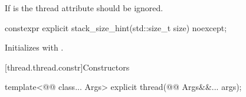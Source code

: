 \documentclass{wg21}
\begin{document}
\begin{addedblock}
If  is  the thread attribute should be ignored.

\begin{itemdecl}
constexpr explicit stack_size_hint(std::size_t size) noexcept;
\end{itemdecl}

\begin{itemdescr}
\effects Initializes  with .
\end{itemdescr}

\end{addedblock}


[thread.thread.constr]{Constructors}

\begin{itemdecl}
template<@@ class... Args>
explicit thread(@@ Args&&... args);
\end{itemdecl}
\end{document}

